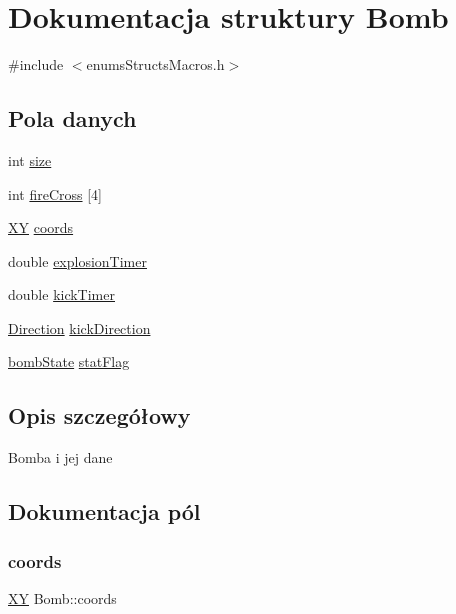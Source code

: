 \hypertarget{struct_bomb}{}\section{Dokumentacja struktury Bomb}
\label{struct_bomb}


{\ttfamily \#include $<$enums\+Structs\+Macros.\+h$>$}

\subsection*{Pola danych}
\begin{DoxyCompactItemize}
\item 
int \mbox{\hyperlink{struct_bomb_a62a917b182cdb7bfcb3238b8a3b9eb79}{size}}
\item 
int \mbox{\hyperlink{struct_bomb_ae1bf7a018e0fb6b751320e41e139b0d0}{fire\+Cross}} \mbox{[}4\mbox{]}
\item 
\mbox{\hyperlink{struct_x_y}{XY}} \mbox{\hyperlink{struct_bomb_aee2e79180661220dc9bd5639fbfc25df}{coords}}
\item 
double \mbox{\hyperlink{struct_bomb_abaeef5c4cd2e2e25688ba625fe13bcc3}{explosion\+Timer}}
\item 
double \mbox{\hyperlink{struct_bomb_aa2ac1f6a85cb9e141f3a8313f05091cc}{kick\+Timer}}
\item 
\mbox{\hyperlink{enums_structs_macros_8h_a224b9163917ac32fc95a60d8c1eec3aa}{Direction}} \mbox{\hyperlink{struct_bomb_a0bf8b6ceb32adcee6dad5b4f32605ce2}{kick\+Direction}}
\item 
\mbox{\hyperlink{enums_structs_macros_8h_a85862f8bba17794a87d664e16fe33acb}{bomb\+State}} \mbox{\hyperlink{struct_bomb_a2fa3684effcc6e03d4ca9d47cc92c0b4}{stat\+Flag}}
\end{DoxyCompactItemize}


\subsection{Opis szczegółowy}
Bomba i jej dane 

\subsection{Dokumentacja pól}
\mbox{\label{struct_bomb_aee2e79180661220dc9bd5639fbfc25df}} 
\subsubsection{\texorpdfstring{coords}{coords}}
{\footnotesize\ttfamily \mbox{\hyperlink{struct_x_y}{XY}} Bomb\+::coords}

